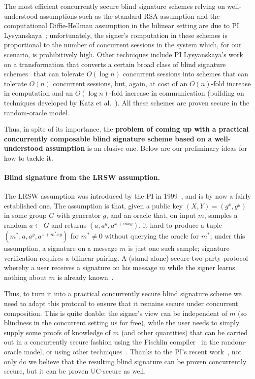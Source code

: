 The most efficient concurrently secure blind signature schemes relying on well-understood assumptions such as the standard RSA assumption and the computational Diffie-Hellman assumption in the bilinear setting are due to PI Lysyanskaya~\cite{chllw22}; unfortunately, the signer's computation in these schemes is proportional to the number of concurrent sessions in the system which, for our scenario, is prohibitively high. 
Other techniques include PI Lysyanskaya's work~\cite{chllw22} on a transformation that converts a certain broad class of blind signature schemes~\cite{EC:HauKilLos19} that can tolerate $O(\log n)$ concurrent sessions into schemes that can tolerate $O(n)$ concurrent sessions, but, again, at cost of an $O(n)$-fold increase in computation and an $O(\log n)$-fold increase in communication (building on techniques developed by Katz et al.~\cite{AC:KatLosRos21}).  All these schemes are proven secure in the random-oracle model.

Thus, in spite of its importance, the \textbf{problem of coming up with a practical concurrently composable blind signature scheme based on a well-understood assumption} is an elusive one.  Below are our preliminary ideas for how to tackle it.

\paragraph{Blind signature from the LRSW assumption.} The LRSW assumption was introduced by the PI in 1999~\cite{SAC:lrsw99,lysyan99}, and is by now a fairly established one.  The assumption is that, given a public key $(X,Y)= (g^x,g^y)$ in some group $G$ with generator $g$, and an oracle that, on input $m$, samples a random $a\leftarrow G$ and returns $(a,a^y,a^{x+mxy})$, it hard to produce a tuple $(m^*,a,a^y,a^{x+m^*xy})$ for $m^*\neq 0$ without querying the oracle for $m^*$; under this assumption, a signature on a message $m$ is just one such sample; signature verification requires a bilinear pairing.  A (stand-alone) secure two-party protocol whereby a user receives a signature on his message $m$ while the signer learns nothing about $m$ is already known~\cite{C:CamLys04}.  

Thus, to turn it into a practical concurrently secure blind signature scheme we need to adapt this protocol to ensure that it remains secure under concurrent composition.  This is quite doable: the signer's view can be independent of $m$ (so blindness in the concurrent setting us for free), while the user needs to simply supply some proofs of knowledge of $m$ (and other quantities) that can be carried out in a concurrently secure fashion using the Fischlin compiler~\cite{C:Fischlin05} in the random-oracle model, or using other techniques~\cite{AC:CamDam00,C:CamSho03}. Thanks to the PI's recent work~\cite{lysros22}, not only do we believe that the resulting blind signature can be proven concurrently secure, but it can be proven UC-secure as well. 

